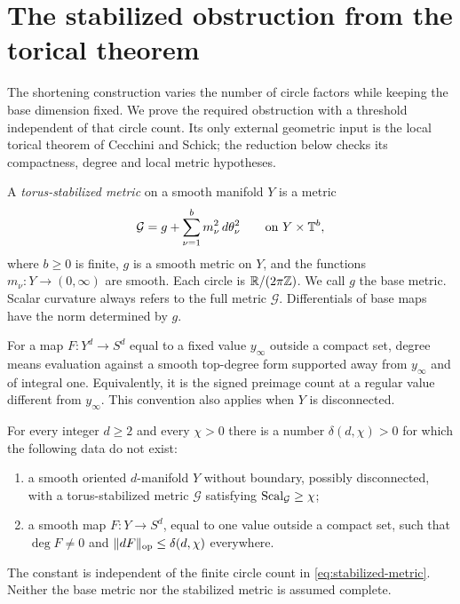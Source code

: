 \section{The stabilized obstruction from the torical theorem}
\label{sec:obstruction}

The shortening construction varies the number of circle factors while
keeping the base dimension fixed. We prove the required obstruction with
a threshold independent of that circle count. Its only external geometric
input is the local torical theorem of Cecchini and Schick; the reduction
below checks its compactness, degree and local metric hypotheses.

\begin{definition}
\label{def:torical-metric}
A \emph{torus-stabilized metric} on a smooth manifold $Y$ is a metric
\begin{equation}
\label{eq:stabilized-metric}
 \mathcal G=g+\sum_{\nu=1}^{b}m_\nu^2\,d\theta_\nu^2
 \qquad\text{on }Y\times\mathbb T^b,
\end{equation}
where $b\geq0$ is finite, $g$ is a smooth metric on $Y$, and the functions
$m_\nu:Y\to(0,\infty)$ are smooth. Each circle is
$\mathbb R/(2\pi\mathbb Z)$. We call $g$ the base metric.
Scalar curvature always refers to the full metric $\mathcal G$.
Differentials of base maps have the norm determined by $g$.
\end{definition}

For a map $F:Y^d\to S^d$ equal to a fixed value $y_\infty$ outside a
compact set, degree means evaluation against a smooth top-degree form
supported away from $y_\infty$ and of integral one. Equivalently, it is the
signed preimage count at a regular value different from $y_\infty$.
This convention also applies when $Y$ is disconnected.

\begin{theorem}
\label{thm:torical-obstruction}
For every integer $d\geq2$ and every $\chi>0$ there is a number
$\delta(d,\chi)>0$ for which the following data do not exist:
\begin{enumerate}
 \item a smooth oriented $d$-manifold $Y$ without boundary, possibly
 disconnected, with a torus-stabilized metric $\mathcal G$ satisfying
 $\operatorname{Scal}_{\mathcal G}\geq\chi$;
 \item a smooth map $F:Y\to S^d$, equal to one value outside a compact
 set, such that $\deg F\ne0$ and
 $\lVert dF\rVert_{\mathrm{op}}\leq\delta(d,\chi)$ everywhere.
\end{enumerate}
The constant is independent of the finite circle count in
\cref{eq:stabilized-metric}. Neither the base metric nor the stabilized
metric is assumed complete.
\end{theorem}

